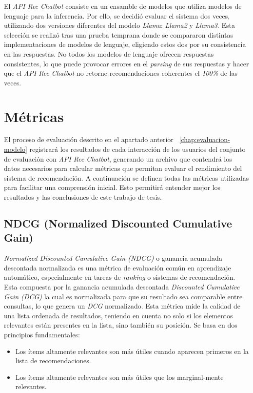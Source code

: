 \documentclass[11pt,a4paper,twoside]{thesis}
\begin{document}
El \textit{API Rec Chatbot} consiste en un ensamble de modelos que utiliza modelos de lenguaje para la inferencia. Por ello, se decidió evaluar el sistema dos veces, utilizando dos versiones diferentes del modelo \textit{Llama}: \textit{Llama2} y \textit{Llama3}. Esta selección se realizó tras una prueba temprana donde se compararon distintas implementaciones de modelos de lenguaje, eligiendo estos dos por su consistencia en las respuestas. No todos los modelos de lenguaje ofrecen respuestas consistentes, lo que puede provocar errores en el \textit{parsing} de sus respuestas y hacer que el \textit{API Rec Chatbot} no retorne recomendaciones coherentes el \textit{100\%} de las veces.


\section{Métricas}

El proceso de evaluación descrito en el apartado anterior ~\ref{chap:evaluacion-modelo} registrará los resultados de cada interacción de los usuarios del conjunto de evaluación con  \textit{API Rec Chatbot}, generando un archivo que contendrá los datos necesarios para calcular métricas que permitan evaluar el rendimiento del sistema de recomendación. A continuación se definen todas las métricas utilizadas para facilitar una comprensión inicial. Esto permitirá entender mejor los resultados y las conclusiones de este trabajo de tesis.

\subsection{NDCG (Normalized Discounted Cumulative Gain)}


\textit{Normalized Discounted Cumulative Gain (NDCG)} o ganancia acumulada descontada normalizada es una métrica de evaluación común en aprendizaje automático, especialmente en tareas de \textit{ranking} o sistemas de recomendación. Esta compuesta por la ganancia acumulada descontada \textit{Discounted Cumulative Gain (DCG)} la cual es normalizada para que su resultado sea comparable entre consultas, lo que genera un \textit{DCG} normalizado. Esta métrica mide la calidad de una lista ordenada de resultados, teniendo en cuenta no solo si los elementos relevantes están presentes en la lista, sino también su posición. Se basa en dos principios fundamentales:

\begin{itemize}
	\item Los ítems altamente relevantes son más útiles cuando aparecen primeros en la lista de recomendaciones.
	\item Los ítems altamente relevantes son más útiles que los marginal-mente relevantes.
\end{itemize}
\end{document}
